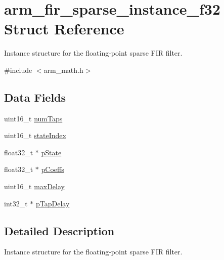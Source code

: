 \hypertarget{structarm__fir__sparse__instance__f32}{\section{arm\-\_\-fir\-\_\-sparse\-\_\-instance\-\_\-f32 Struct Reference}
\label{structarm__fir__sparse__instance__f32}
}


Instance structure for the floating-\/point sparse F\-I\-R filter.  




{\ttfamily \#include $<$arm\-\_\-math.\-h$>$}

\subsection*{Data Fields}
\begin{DoxyCompactItemize}
\item 
uint16\-\_\-t \hyperlink{structarm__fir__sparse__instance__f32_a751941891e47f522a7f5375fe8990aac}{num\-Taps}
\item 
uint16\-\_\-t \hyperlink{structarm__fir__sparse__instance__f32_a566a0cb53437e48b9a3bf18e5b03d8aa}{state\-Index}
\item 
float32\-\_\-t $\ast$ \hyperlink{structarm__fir__sparse__instance__f32_a335c87e6fdc4b96601d95a5de8b9c463}{p\-State}
\item 
float32\-\_\-t $\ast$ \hyperlink{structarm__fir__sparse__instance__f32_aacbb8dd8eeba4b21fc2bb40076405ee3}{p\-Coeffs}
\item 
uint16\-\_\-t \hyperlink{structarm__fir__sparse__instance__f32_ab25f4ee7550e6d92acff77ada283733f}{max\-Delay}
\item 
int32\-\_\-t $\ast$ \hyperlink{structarm__fir__sparse__instance__f32_adec00b3793ab4f08edfeb4ea6a9eb6e6}{p\-Tap\-Delay}
\end{DoxyCompactItemize}


\subsection{Detailed Description}
Instance structure for the floating-\/point sparse F\-I\-R filter. 

